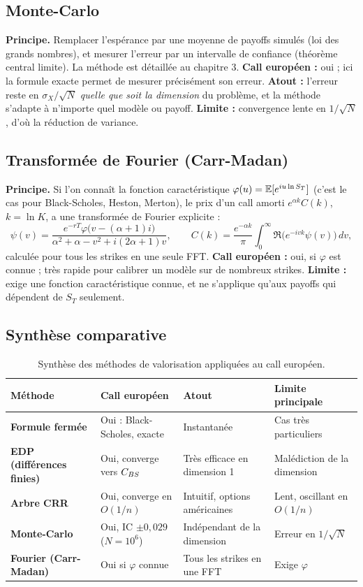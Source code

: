 \subsection{Monte-Carlo}
\textbf{Principe.} Remplacer l'espérance par une moyenne de payoffs simulés (loi des grands nombres), et mesurer l'erreur par un intervalle de confiance (théorème central limite). La méthode est détaillée au chapitre 3.
\textbf{Call européen :} oui ; ici la formule exacte permet de mesurer précisément son erreur.
\textbf{Atout :} l'erreur reste en $\sigma_X/\sqrt N$ \emph{quelle que soit la dimension} du problème, et la méthode s'adapte à n'importe quel modèle ou payoff.
\textbf{Limite :} convergence lente en $1/\sqrt N$, d'où la réduction de variance.

\subsection{Transformée de Fourier (Carr-Madan)}
\textbf{Principe.} Si l'on connaît la fonction caractéristique $\varphi(u) = \mathbb{E}[e^{iu\ln S_T}]$ (c'est le cas pour Black-Scholes, Heston, Merton), le prix d'un call amorti $e^{\alpha k}C(k)$, $k = \ln K$, a une transformée de Fourier explicite :
\[
\psi(v) = \frac{e^{-rT}\varphi\big(v-(\alpha+1)i\big)}{\alpha^2+\alpha-v^2+i(2\alpha+1)v},\qquad C(k) = \frac{e^{-\alpha k}}{\pi}\int_0^\infty \Re\big(e^{-ivk}\psi(v)\big)\,dv,
\]
calculée pour tous les strikes en une seule FFT.
\textbf{Call européen :} oui, si $\varphi$ est connue ; très rapide pour calibrer un modèle sur de nombreux strikes.
\textbf{Limite :} exige une fonction caractéristique connue, et ne s'applique qu'aux payoffs qui dépendent de $S_T$ seulement.

\subsection{Synthèse comparative}

\begin{table}[H]
\centering\small
\begin{tabularx}{\textwidth}{>{\bfseries}p{2.6cm}LLL}
\toprule
Méthode & Call européen & Atout & Limite principale \\
\midrule
Formule fermée & Oui : Black-Scholes, exacte & Instantanée & Cas très particuliers \\
EDP (différences finies) & Oui, converge vers $C_{BS}$ & Très efficace en dimension 1 & Malédiction de la dimension \\
Arbre CRR & Oui, converge en $O(1/n)$ & Intuitif, options américaines & Lent, oscillant en $O(1/n)$ \\
Monte-Carlo & Oui, IC $\pm0{,}029$ ($N=10^6$) & Indépendant de la dimension & Erreur en $1/\sqrt N$ \\
Fourier (Carr-Madan) & Oui si $\varphi$ connue & Tous les strikes en une FFT & Exige $\varphi$ \\
\bottomrule
\end{tabularx}
\caption{Synthèse des méthodes de valorisation appliquées au call européen.}
\end{table}

